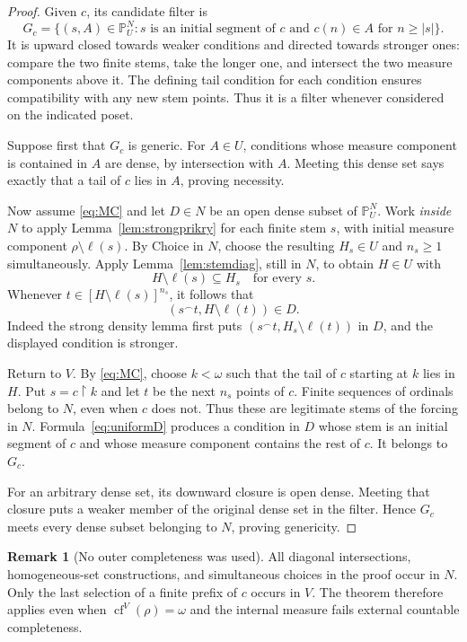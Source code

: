 \documentclass[11pt,letterpaper]{article}
\theoremstyle{definition}
\newtheorem{remark}[definition]{Remark}
\newcommand{\cf}{\operatorname{cf}}
\newcommand{\restr}{\mathbin{\upharpoonright}}
\newcommand{\PP}{\mathbb P}
\begin{document}
\begin{proof}
Given $c$, its candidate filter is
\[
 G_c=\{(s,A)\in\PP_U^N:s\text{ is an initial segment of }c
                  \text{ and }c(n)\in A\text{ for }n\ge |s|\}.
\]
It is upward closed towards weaker conditions and directed towards stronger ones: compare the two finite stems, take the longer one, and intersect the two measure components above it. The defining tail condition for each condition ensures compatibility with any new stem points. Thus it is a filter whenever considered on the indicated poset.

Suppose first that $G_c$ is generic. For $A\in U$, conditions whose measure component is contained in $A$ are dense, by intersection with $A$. Meeting this dense set says exactly that a tail of $c$ lies in $A$, proving necessity.

Now assume \eqref{eq:MC} and let $D\in N$ be an open dense subset of $\PP_U^N$. Work \emph{inside $N$} to apply Lemma~\ref{lem:strongprikry} for each finite stem $s$, with initial measure component $\rho\setminus\ell(s)$. By Choice in $N$, choose the resulting $H_s\in U$ and $n_s\ge1$ simultaneously. Apply Lemma~\ref{lem:stemdiag}, still in $N$, to obtain $H\in U$ with
\[
                              H\setminus\ell(s)\subseteq H_s
                                  \quad\text{for every }s.
\]
Whenever $t\in[H\setminus\ell(s)]^{n_s}$, it follows that
\[
                     (s\mathbin{^\frown}t,H\setminus\ell(t))\in D.
                     \tag{*}\label{eq:uniformD}
\]
Indeed the strong density lemma first puts $(s\mathbin{^\frown}t,H_s\setminus\ell(t))$ in $D$, and the displayed condition is stronger.

Return to $V$. By \eqref{eq:MC}, choose $k<\omega$ such that the tail of $c$ starting at $k$ lies in $H$. Put $s=c\restr k$ and let $t$ be the next $n_s$ points of $c$. Finite sequences of ordinals belong to $N$, even when $c$ does not. Thus these are legitimate stems of the forcing in $N$. Formula~\eqref{eq:uniformD} produces a condition in $D$ whose stem is an initial segment of $c$ and whose measure component contains the rest of $c$. It belongs to $G_c$.

For an arbitrary dense set, its downward closure is open dense. Meeting that closure puts a weaker member of the original dense set in the filter. Hence $G_c$ meets every dense subset belonging to $N$, proving genericity.
\end{proof}

\begin{remark}[No outer completeness was used]
All diagonal intersections, homogeneous-set constructions, and simultaneous choices in the proof occur in $N$. Only the last selection of a finite prefix of $c$ occurs in $V$. The theorem therefore applies even when $\cf^V(\rho)=\omega$ and the internal measure fails external countable completeness.
\end{remark}
\end{document}
